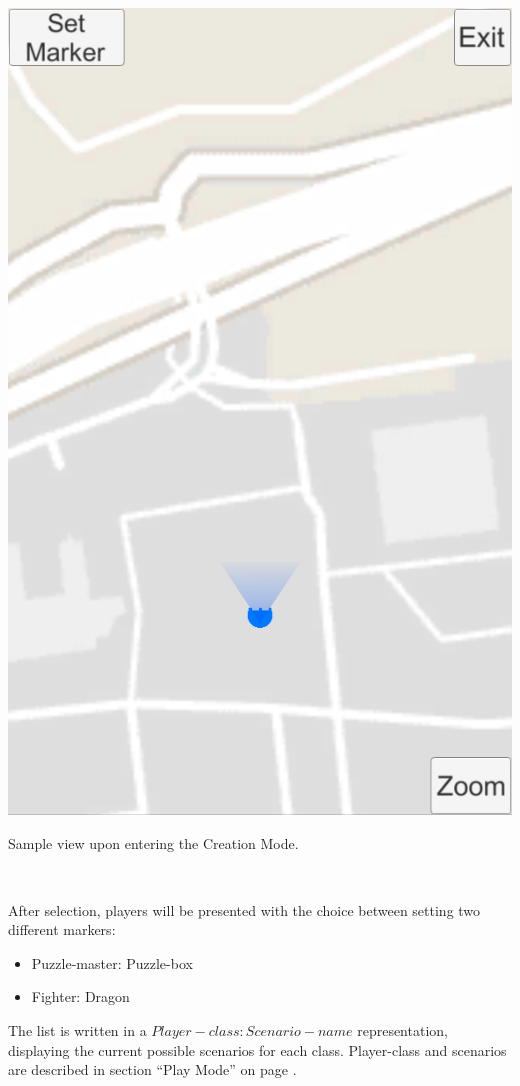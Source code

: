 \documentclass{sigchi-ext}
\begin{document}
\begin{marginfigure}[8pc]
	\begin{minipage}{\marginparwidth}
		\centering
		\includegraphics[width=0.9\marginparwidth]{figures/CM_Entering}
		\caption{Sample view upon entering the Creation Mode.}~\label{fig:CM_Entering}
	\end{minipage}
\end{marginfigure}

After selection, players will be presented with the choice between setting two different markers:
\begin{itemize}\compresslist%
	\item Puzzle-master: Puzzle-box
	\item Fighter: Dragon
\end{itemize}
The list is written in a $Player-class: Scenario-name$ representation, displaying the current possible scenarios for each class. Player-class and scenarios are described in section ``Play Mode'' on page \pageref{sec:Play}.
\end{document}
